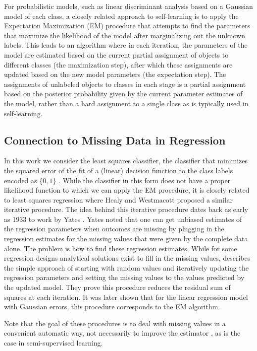 \documentclass[conference,a4paper,10pt]{IEEEtran}\usepackage[]{graphicx}\usepackage[]{color}
\begin{document}
For probabilistic models, such as linear discriminant analysis based on a Gaussian model of each class, a closely related approach to self-learning is to apply the Expectation Maximization (EM) procedure \cite{Dempster1977} that attempts to find the parameters that maximize the likelihood  of the model after marginalizing out the unknown labels. This leads to an algorithm where in each iteration, the parameters of the model are estimated based on the current partial assignment of objects to different classes (the maximization step), after which these assignments are updated based on the new model parameters (the expectation step). The assignments of unlabeled objects to classes in each stage is a partial assignment based on the posterior probability given by the current parameter estimates of the model, rather than a hard assignment to a single class as is typically used in self-learning.

\subsection{Connection to Missing Data in Regression}
In this work we consider the least squares classifier, the classifier that minimizes the squared error of the fit of a (linear) decision function to the class labels encoded as $\{0,1\}$ \cite[p.103]{Hastie2009}. While the classifier in this form does not have a proper likelihood function to which we can apply the EM procedure, it is closely related to least squares regression where Healy and Westmacott \cite{Healy1956} proposed a similar iterative procedure. The idea behind this iterative procedure dates back as early as 1933 to work by Yates \cite{Yates1933}. Yates noted that one can get unbiased estimates of the regression parameters when outcomes are missing by plugging in the regression estimates for the missing values that were given by the complete data alone. The problem is how to find these regression estimates. While for some regression designs analytical solutions exist \cite{Wilkinson1958} to fill in the missing values, \cite{Healy1956} describes the simple approach of starting with random values and iteratively updating the regression parameters and setting the missing values to the values predicted by the updated model.
They prove this procedure reduces the residual sum of squares at each iteration. It was later shown \cite{Dempster1977} that for the linear regression model with Gaussian errors, this procedure corresponds to the EM algorithm.

Note that the goal of these procedures is to deal with missing values in a convenient automatic way, not necessarily to improve the estimator \cite[Ch. 2]{Little2002}, as is the case in semi-supervised learning.
\end{document}
